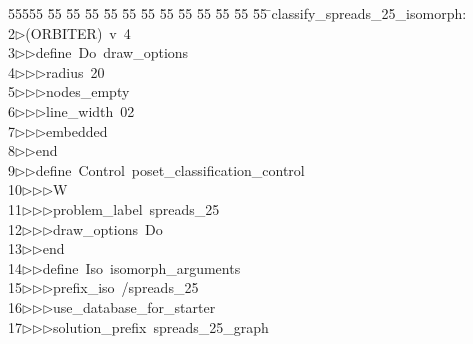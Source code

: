%
%
\begin{tabbing}
55555 \= 55 \= 55 \= 55 \= 55 \= 55 \= 55 \= 55 \= 55 \= 55 \= 55 \= 55 \= 55 \= \>classify\_spreads\_25\_isomorph:\\[0pt]
2\>$\triangleright$\>(ORBITER)\ v\ 4\ \\[0pt]
3\>$\triangleright$\>$\triangleright$\>define\ Do\ draw\_options\ \\[0pt]
4\>$\triangleright$\>$\triangleright$\>$\triangleright$\>radius\ 20\ \\[0pt]
5\>$\triangleright$\>$\triangleright$\>$\triangleright$\>nodes\_empty\ \\[0pt]
6\>$\triangleright$\>$\triangleright$\>$\triangleright$\>line\_width\ 02\ \\[0pt]
7\>$\triangleright$\>$\triangleright$\>$\triangleright$\>embedded\ \\[0pt]
8\>$\triangleright$\>$\triangleright$\>end\ \\[0pt]
9\>$\triangleright$\>$\triangleright$\>define\ Control\ poset\_classification\_control\ \\[0pt]
10\>$\triangleright$\>$\triangleright$\>$\triangleright$\>W\ \\[0pt]
11\>$\triangleright$\>$\triangleright$\>$\triangleright$\>problem\_label\ spreads\_25\ \\[0pt]
12\>$\triangleright$\>$\triangleright$\>$\triangleright$\>draw\_options\ Do\ \\[0pt]
13\>$\triangleright$\>$\triangleright$\>end\ \\[0pt]
14\>$\triangleright$\>$\triangleright$\>define\ Iso\ isomorph\_arguments\ \\[0pt]
15\>$\triangleright$\>$\triangleright$\>$\triangleright$\>prefix\_iso\ /spreads\_25\ \\[0pt]
16\>$\triangleright$\>$\triangleright$\>$\triangleright$\>use\_database\_for\_starter\ \\[0pt]
17\>$\triangleright$\>$\triangleright$\>$\triangleright$\>solution\_prefix\ spreads\_25\_graph\ \\[0pt]

\end{tabbing}
